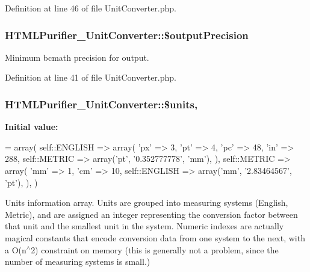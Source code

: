 Definition at line 46 of file Unit\+Converter.\+php.

\hypertarget{classHTMLPurifier__UnitConverter_a0f78b7cbeb6d98e1afca5a50e696fa9e}{
\subsubsection[{\$output\+Precision}]{\setlength{\rightskip}{0pt plus 5cm}H\+T\+M\+L\+Purifier\+\_\+\+Unit\+Converter\+::\$output\+Precision\hspace{0.3cm}{\ttfamily [protected]}}}\label{classHTMLPurifier__UnitConverter_a0f78b7cbeb6d98e1afca5a50e696fa9e}
Minimum bcmath precision for output. 

Definition at line 41 of file Unit\+Converter.\+php.

\hypertarget{classHTMLPurifier__UnitConverter_afd94f4945be1c24f15c3db2898cc4f21}{
\subsubsection[{\$units}]{\setlength{\rightskip}{0pt plus 5cm}H\+T\+M\+L\+Purifier\+\_\+\+Unit\+Converter\+::\$units\hspace{0.3cm}{\ttfamily [static]}, {\ttfamily [protected]}}}\label{classHTMLPurifier__UnitConverter_afd94f4945be1c24f15c3db2898cc4f21}
{\bfseries Initial value\+:}
\begin{DoxyCode}
= array(
        self::ENGLISH => array(
            \textcolor{stringliteral}{'px'} => 3, 
            \textcolor{stringliteral}{'pt'} => 4,
            \textcolor{stringliteral}{'pc'} => 48,
            \textcolor{stringliteral}{'in'} => 288,
            self::METRIC => array(\textcolor{stringliteral}{'pt'}, \textcolor{stringliteral}{'0.352777778'}, \textcolor{stringliteral}{'mm'}),
        ),
        self::METRIC => array(
            \textcolor{stringliteral}{'mm'} => 1,
            \textcolor{stringliteral}{'cm'} => 10,
            self::ENGLISH => array(\textcolor{stringliteral}{'mm'}, \textcolor{stringliteral}{'2.83464567'}, \textcolor{stringliteral}{'pt'}),
        ),
    )
\end{DoxyCode}
Units information array. Units are grouped into measuring systems (English, Metric), and are assigned an integer representing the conversion factor between that unit and the smallest unit in the system. Numeric indexes are actually magical constants that encode conversion data from one system to the next, with a O(n$^\wedge$2) constraint on memory (this is generally not a problem, since the number of measuring systems is small.) 


